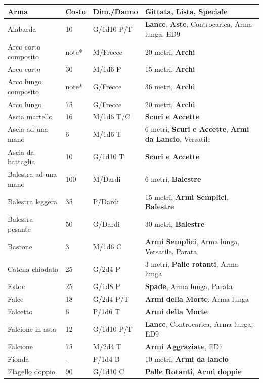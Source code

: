 \noindent\begin{xltabular}{\linewidth}{lllX}
\textbf{Arma}&\textbf{Costo}&\textbf{Dim./Danno} & \textbf{Gittata, Lista, Speciale}\\
\hline
Alabarda& 10 & G/1d10 P/T& \textbf{Lance}, \textbf{Aste}, Controcarica, Arma lunga, ED9 \\
Arco corto composito& note*& M/Frecce& 20 metri, \textbf{Archi}\\
Arco corto& 30 & M/1d6 P& 15 metri, \textbf{Archi}\\
Arco lungo composito& note*& G/Frecce& 36 metri, \textbf{Archi}\\
Arco lungo& 75 & G/Frecce& 20 metri, \textbf{Archi}\\
Ascia martello& 16 & M/1d6 T/C& \textbf{Scuri e Accette}\\
Ascia ad una mano& 6 & M/1d6 T& 6 metri, \textbf{Scuri e Accette}, \textbf{Armi da Lancio}, Versatile\\
Ascia da battaglia& 10 & G/1d10 T&\textbf{Scuri e Accette}\\
Balestra ad una mano& 100& M/Dardi& 6 metri, \textbf{Balestre}\\
Balestra leggera& 35 & P/Dardi& 15 metri, \textbf{Armi Semplici}, \textbf{Balestre}\\
Balestra pesante& 50 & G/Dardi& 30 metri, \textbf{Balestre}\\
Bastone& 3& M/1d6 C& \textbf{Armi Semplici}, Arma lunga, Versatile, Parata\\
Catena chiodata& 25 & G/2d4 P& 3 metri, \textbf{Palle rotanti}, Arma lunga\\
Estoc& 25& G/1d8 P& \textbf{Spade}, Arma lunga, Parata\\
Falce& 18 & G/2d4 P/T& \textbf{Armi della Morte}, Arma lunga\\
Falcetto& 6& P/1d6 T& \textbf{Armi della Morte}\\
Falcione in asta& 12 & G/1d10 P/T& \textbf{Lance}, Controcarica, Arma lunga, ED9\\
Falcione& 75 & M/2d4 T& \textbf{Armi Aggraziate}, ED7\\
Fionda& -& P/1d4 B& 10 metri, \textbf{Armi da lancio}\\
Flagello doppio& 90 & G/1d10 C& \textbf{Palle Rotanti}, \textbf{Armi doppie}\\

\end{xltabular}
